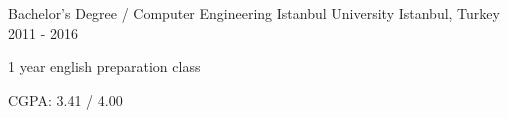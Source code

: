 

\begin{cventries}

  \cventry
    {Bachelor's Degree / Computer Engineering} %
    {Istanbul University} %
    {Istanbul, Turkey} %
    {2011 - 2016} %
    {
      \begin{cvitems} %
        \item {1 year english preparation class}
        \item {CGPA: 3.41 / 4.00}
      \end{cvitems}
    }

\end{cventries}
